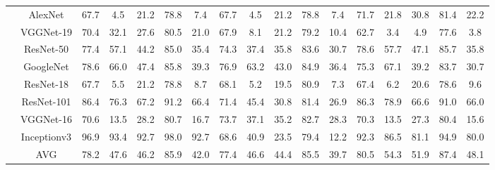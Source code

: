 \documentclass[12pt,italian]{article}
\begin{document}
\begin{tiny}
\begin{longtable}{lcccccccccccccccc}
& AlexNet & 67.7 &  4.5 & 21.2 & 78.8 &  7.4 & 67.7 &  4.5 & 21.2 & 78.8 &  7.4 & 71.7 & 21.8 & 30.8 & 81.4 & 22.2 \\ 
& VGGNet-19 & 70.4 & 32.1 & 27.6 & 80.5 & 21.0 & 67.9 &  8.1 & 21.2 & 79.2 & 10.4 & 62.7 &  3.4 &  4.9 & 77.6 &  3.8 \\ 
& ResNet-50 & 77.4 & 57.1 & 44.2 & 85.0 & 35.4 & 74.3 & 37.4 & 35.8 & 83.6 & 30.7 & 78.6 & 57.7 & 47.1 & 85.7 & 35.8 \\ 
& GoogleNet & 78.6 & 66.0 & 47.4 & 85.8 & 39.3 & 76.9 & 63.2 & 43.0 & 84.9 & 36.4 & 75.3 & 67.1 & 39.2 & 83.7 & 30.7 \\ 
& ResNet-18 & 67.7 &  5.5 & 21.2 & 78.8 &  8.7 & 68.1 &  5.2 & 19.5 & 80.9 &  7.3 & 67.4 &  6.2 & 20.6 & 78.6 &  9.6 \\ 
& ResNet-101 & 86.4 & 76.3 & 67.2 & 91.2 & 66.4 & 71.4 & 45.4 & 30.8 & 81.4 & 26.9 & 86.3 & 78.9 & 66.6 & 91.0 & 66.0 \\ 
& VGGNet-16 & 70.6 & 13.5 & 28.2 & 80.7 & 16.7 & 73.7 & 37.1 & 35.2 & 82.7 & 28.3 & 70.3 & 13.5 & 27.3 & 80.4 & 15.6 \\ 
& Inceptionv3 & 96.9 & 93.4 & 92.7 & 98.0 & 92.7 & 68.6 & 40.9 & 23.5 & 79.4 & 12.2 & 92.3 & 86.5 & 81.1 & 94.9 & 80.0 \\ 
\hline
& AVG & 78.2 & 47.6 & 46.2 & 85.9 & 42.0 & 77.4 & 46.6 & 44.4 & 85.5 & 39.7 & 80.5 & 54.3 & 51.9 & 87.4 & 48.1 \\ 
\hline
\bottomrule
\end{longtable} 

 \pagebreak 
\end{tiny} 
 
\end{document}
